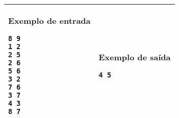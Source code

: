 \vspace{-0.3cm}
\begin{table}[!h]
\centering
\begin{tabular}{|l|l|}
\hline
\begin{minipage}[t]{3in}
\textbf{Exemplo de entrada}
\begin{verbatim}
8 9
1 2
2 5
2 6
5 6
3 2
7 6
3 7
4 3
8 7
\end{verbatim}
\vspace{1mm}
\end{minipage}
&
\begin{minipage}[t]{3in}
\textbf{Exemplo de saída}
\begin{verbatim}
4 5
\end{verbatim}
\vspace{1mm}
\end{minipage} \\
\hline
\end{tabular}
\end{table}
